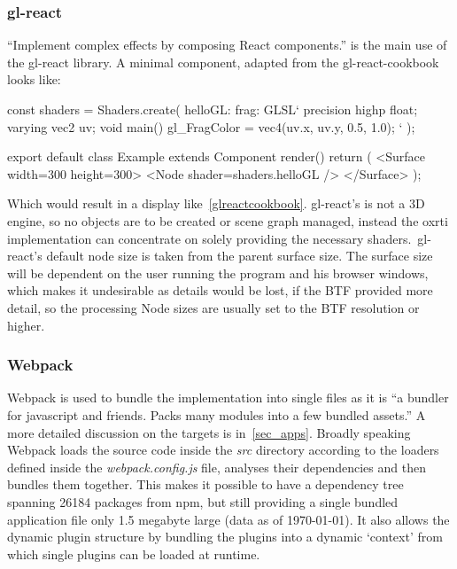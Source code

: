   \subsubsection*{gl-react}
 ``Implement complex effects by composing React
  components.''\cite*{renaudeau_gl-react_2018} is the main use of the gl-react
  library. A minimal component, adapted from the gl-react-cookbook looks
  like\cite*{renaudeau_gl-react_2018}:
\begin{typescript}
const shaders = Shaders.create({
  helloGL: {
    frag: GLSL`
     precision highp float;
     varying vec2 uv;
     void main() {
      gl_FragColor = vec4(uv.x, uv.y, 0.5, 1.0);
   }`
 }
});

export default class Example extends Component {
  render() {
    return (
      <Surface width={300} height={300}>
        <Node shader={shaders.helloGL} />
      </Surface>
    );
  }
}
\end{typescript}
  Which would result in a display like~\autoref{glreactcookbook}.
   gl-react's is not a 3D engine, so no
  objects are to be created or scene graph managed, instead the oxrti
  implementation can concentrate on solely providing the necessary shaders.\
  gl-react's default node size is taken from the parent surface size. The
  surface size will be dependent on the user running the program and his browser
  windows, which makes it undesirable as details would be lost, if the BTF
  provided more detail, so the processing Node sizes are usually set to the BTF
  resolution or higher.
  \subsubsection*{Webpack}
  Webpack is used to bundle the implementation into single files as it is ``a bundler for javascript and friends. Packs many modules into a few bundled
  assets.''\cite*{noauthor_webpack/webpack:_nodate} A more detailed discussion
  on the targets is in~\autoref{sec_apps}. Broadly speaking Webpack loads the
  source code inside the \emph{src} directory according to the loaders defined
  inside the \emph{webpack.config.js} file, analyses their dependencies and then
  bundles them together. This makes it possible to have a dependency tree
  spanning 26184 packages from npm, but still providing a single bundled
  application file only 1.5 megabyte large (data as of \today). It also allows
  the dynamic plugin structure by bundling the plugins into a dynamic `context' from
  which single plugins can be loaded at runtime.
